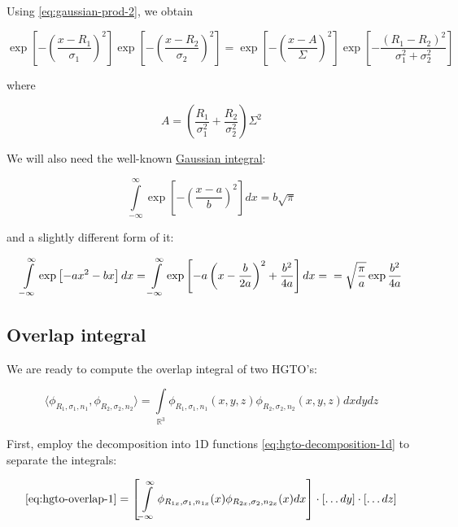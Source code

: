 \documentclass{article}
\begin{document}
\begin{appendices}
Using \eqref{eq:gaussian-prod-2}, we obtain

\begin{equation} \label{eq:gaussian-prod}
\exp\left[-\left(\frac{x-R_1}{\sigma_1}\right)^2\right]\exp\left[-\left(\frac{x-R_2}{\sigma_2}\right)^2\right] =
\exp\left[-\left(\frac{x-A}{\Sigma}\right)^2\right]\exp\left[-\frac{(R_1-R_2)^2}{\sigma_1^2 + \sigma_2^2}\right]
\end{equation}

where

\begin{equation}
A = \left(\frac{R_1}{\sigma_1^2}+\frac{R_2}{\sigma_2^2}\right)\Sigma^2
\end{equation}

We will also need the well-known \href{https://en.wikipedia.org/wiki/Gaussian_integral}{Gaussian integral}:

\begin{equation} \label{eq:gaussian}
\int\limits_{-\infty}^\infty \exp\left[-\left(\frac{x-a}{b}\right)^2\right]dx = b\sqrt\pi
\end{equation}

and a slightly different form of it:

\begin{equation} \label{eq:gaussian-shift}
\int\limits_{-\infty}^\infty \exp\left[-ax^2-bx\right]dx = \int\limits_{-\infty}^\infty \exp\left[-a\left(x-\frac{b}{2a}\right)^2+\frac{b^2}{4a}\right]dx =  \\
= \sqrt{\frac{\pi}{a}}\exp{\frac{b^2}{4a}}
\end{equation}


\subsection{Overlap integral}

We are ready to compute the overlap integral of two HGTO's:

\begin{equation} \label{eq:hgto-overlap-1}
\langle \phi_{R_1,\sigma_1,n_1}, \phi_{R_2,\sigma_2,n_2} \rangle = \int\limits_{\mathbb{R}^3} \phi_{R_1,\sigma_1,n_1}(x,y,z) \phi_{R_2,\sigma_2,n_2}(x,y,z) dxdydz
\end{equation}

First, employ the decomposition into 1D functions \eqref{eq:hgto-decomposition-1d} to separate the integrals:

\begin{equation} \label{eq:hgto-overlap-2}
\eqref{eq:hgto-overlap-1} = \left[\int\limits_{-\infty}^\infty \phi_{R_{1x},\sigma_1,n_{1x}}(x)\phi_{R_{2x},\sigma_2,n_{2x}}(x) dx\right] \cdot \left[\dots dy\right]\cdot \left[\dots dz\right]
\end{equation}


\end{appendices}
\end{document}
